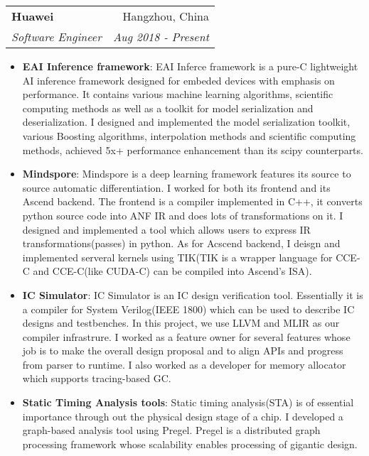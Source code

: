 \documentclass[letterpaper,11pt]{article}
\makeatletter
\newcommand{\resumeItem}[2]{
  \item\small{
    \textbf{#1}{: #2 \vspace{-2pt}}
  }
}
\newcommand{\resumeSubheading}[4]{
  \vspace{-1pt}\item
    \begin{tabular*}{0.97\textwidth}[t]{l@{\extracolsep{\fill}}r}
      \textbf{#1} & #2 \\
      \textit{\small#3} & \textit{\small #4} \\
    \end{tabular*}\vspace{-5pt}
}
\newcommand{\resumeSubSubheading}[2]{
    \begin{tabular*}{0.97\textwidth}{l@{\extracolsep{\fill}}r}
      \textit{\small#1} & \textit{\small #2} \\
    \end{tabular*}\vspace{-5pt}
}
\newcommand{\resumeSubHeadingListEnd}{\end{itemize}}
\newcommand{\resumeItemListStart}{\begin{itemize}}
\newcommand{\resumeItemListEnd}{\end{itemize}\vspace{-5pt}}
\makeatother
\begin{document}
    \resumeSubheading
      {Huawei}{Hangzhou, China}
      {Software Engineer}{Aug 2018 - Present}
      \resumeItemListStart
        \resumeItem{EAI Inference framework}
          {EAI Inferce framework is a pure-C lightweight AI inference framework designed for embeded devices with emphasis on performance.
           It contains various machine learning algorithms, scientific computing methods as well as a toolkit for model serialization and
           deserialization. I designed and implemented the model serialization toolkit, various Boosting algorithms, interpolation methods
           and scientific computing methods, achieved 5x+ performance enhancement than its scipy counterparts.}
        \resumeItem{Mindspore}
          {Mindspore is a deep learning framework features its source to source automatic differentiation. I worked for both its frontend and its
          Ascend backend. The frontend is a compiler implemented in C++, it converts python source code into ANF IR and does lots of transformations on it.
          I designed and implemented a tool which allows users to express IR transformations(passes) in python. As for Acscend backend, I deisgn and implemented
          serveral kernels using TIK(TIK is a wrapper language for CCE-C and CCE-C(like CUDA-C) can be compiled into Ascend's ISA).}
        \resumeItem{IC Simulator}
          {IC Simulator is an IC design verification tool. Essentially it is a compiler for System Verilog(IEEE 1800) which can be used to describe
          IC designs and testbenches. In this project, we use LLVM and MLIR as our compiler infrastrure. I worked as a feature owner for several features
          whose job is to make the overall design proposal and to align APIs and progress from parser to runtime. I also worked as a developer for memory
          allocator which supports tracing-based GC.}
        \resumeItem{Static Timing Analysis tools}
          {Static timing analysis(STA) is of essential importance through out the physical design stage of a chip. I developed a graph-based analysis tool using
          Pregel. Pregel is a distributed graph processing framework whose scalability enables processing of gigantic design.}
      \resumeItemListEnd

\end{document}
